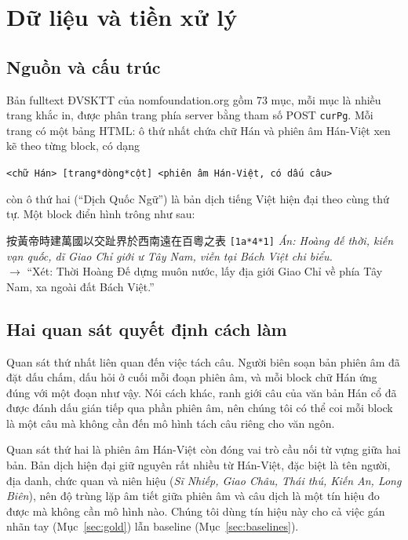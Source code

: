 \documentclass[11pt,a4paper]{article}
\newcommand{\code}[1]{\texttt{#1}}
\begin{document}
\section{Dữ liệu và tiền xử lý}\label{sec:data}

\subsection{Nguồn và cấu trúc}
Bản fulltext ĐVSKTT của nomfoundation.org gồm 73 mục, mỗi mục là nhiều trang khắc in, được phân trang phía server bằng
tham số POST \code{curPg}. Mỗi trang có một bảng HTML: ô thứ nhất chứa chữ Hán và phiên âm Hán-Việt xen kẽ theo từng
block, có dạng
\begin{center}\small\code{<chữ Hán> [trang*dòng*cột] <phiên âm Hán-Việt, có dấu câu>}\end{center}
còn ô thứ hai (``Dịch Quốc Ngữ'') là bản dịch tiếng Việt hiện đại theo cùng thứ tự. Một block điển hình trông như sau:
\begin{center}\small
按黃帝時建萬國以交趾界於西南遠在百粵之表 \code{[1a*4*1]} \emph{Án: Hoàng đế thời, kiến vạn quốc, dĩ Giao Chỉ giới ư
Tây Nam, viễn tại Bách Việt chi biểu.}\\
$\rightarrow$ ``Xét: Thời Hoàng Đế dựng muôn nước, lấy địa giới Giao Chỉ về phía Tây Nam, xa ngoài đất Bách Việt.''
\end{center}

\subsection{Hai quan sát quyết định cách làm}
Quan sát thứ nhất liên quan đến việc tách câu. Người biên soạn bản phiên âm đã đặt dấu chấm, dấu hỏi ở cuối mỗi đoạn
phiên âm, và mỗi block chữ Hán ứng đúng với một đoạn như vậy. Nói cách khác, ranh giới câu của văn bản Hán cổ đã được
đánh dấu gián tiếp qua phần phiên âm, nên chúng tôi có thể coi mỗi block là một câu mà không cần đến mô hình tách câu
riêng cho văn ngôn.

Quan sát thứ hai là phiên âm Hán-Việt còn đóng vai trò cầu nối từ vựng giữa hai bản. Bản dịch hiện đại giữ nguyên rất
nhiều từ Hán-Việt, đặc biệt là tên người, địa danh, chức quan và niên hiệu (\emph{Sĩ Nhiếp, Giao Châu, Thái thú, Kiến
An, Long Biên}), nên độ trùng lặp âm tiết giữa phiên âm và câu dịch là một tín hiệu đo được mà không cần mô hình nào.
Chúng tôi dùng tín hiệu này cho cả việc gán nhãn tay (Mục~\ref{sec:gold}) lẫn baseline (Mục~\ref{sec:baselines}).
\end{document}
